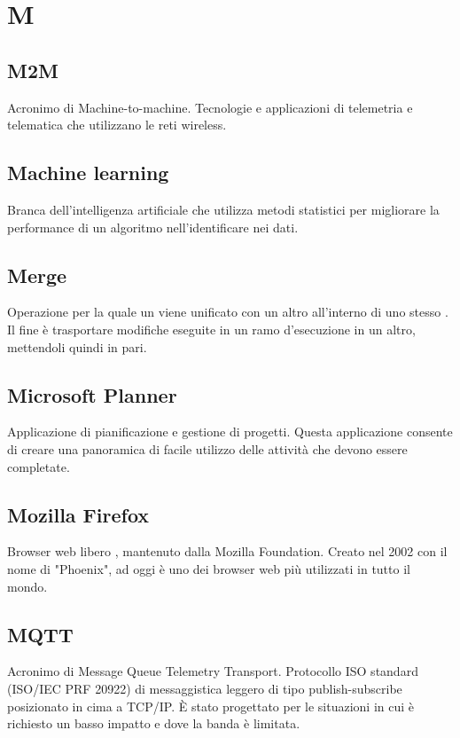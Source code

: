 \section*{M}
\markright{}

\subsection*{M2M}
Acronimo di Machine-to-machine. Tecnologie e applicazioni di telemetria e telematica che utilizzano le reti wireless.

\subsection*{Machine learning}
Branca dell'intelligenza artificiale che utilizza metodi statistici per migliorare la performance di un algoritmo nell'identificare  nei dati.

\subsection*{Merge}
Operazione per la quale un  viene unificato con un altro all'interno di uno stesso . Il fine è trasportare modifiche eseguite in un ramo d'esecuzione in un altro, mettendoli quindi in pari.

\subsection*{Microsoft Planner}
Applicazione di pianificazione e gestione di progetti. Questa applicazione consente di creare una panoramica di facile utilizzo delle attività che devono essere completate.

\subsection*{Mozilla Firefox}
Browser web libero , mantenuto dalla Mozilla Foundation. Creato nel 2002 con il nome di "Phoenix", ad oggi è uno dei browser web più utilizzati in tutto il mondo.

\subsection*{MQTT}
Acronimo di Message Queue Telemetry Transport. Protocollo ISO standard (ISO/IEC PRF 20922) di messaggistica leggero di tipo publish-subscribe posizionato in cima a TCP/IP. È stato progettato per le situazioni in cui è richiesto un basso impatto e dove la banda è limitata. 

